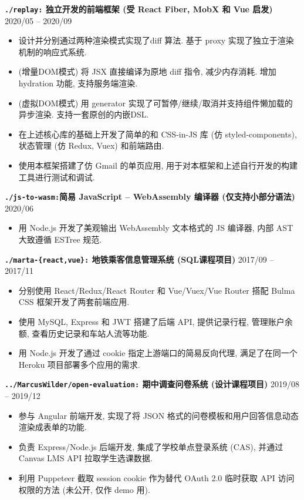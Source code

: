 \documentclass[10 pt]{article}
\begin{document}
\textbf{ \texttt{./replay:} 独立开发的前端框架 (受 React Fiber, MobX 和 Vue 启发) } \hfill 2020/05 -- 2020/09
\begin{itemize}
\item 设计并分别通过两种渲染模式实现了diff 算法. 基于 proxy 实现了独立于渲染机制的响应式系统.
\item (增量DOM模式) 将 JSX 直接编译为原地 diff 指令, 减少内存消耗. 增加 hydration 功能, 支持服务端渲染.
\item (虚拟DOM模式) 用 generator 实现了可暂停/继续/取消并支持组件懒加载的异步渲染. 支持一套原创的内嵌DSL.
\item 在上述核心库的基础上开发了简单的和 CSS-in-JS 库 (仿 styled-components), 状态管理 (仿 Redux, Vuex) 和前端路由.
\item 使用本框架搭建了仿 Gmail 的单页应用, 用于对本框架和上述自行开发的构建工具进行测试和调试.
\end{itemize}

\textbf{\texttt{./js-to-wasm:}简易 JavaScript -- WebAssembly 编译器 (仅支持小部分语法)} \hfill 2020/06
\begin{itemize}
\item 用 Node.js 开发了美观输出 WebAssembly 文本格式的 JS 编译器, 内部 AST 大致遵循 ESTree 规范.
\end{itemize}

\textbf{\texttt{./marta-\{react,vue\}:} 地铁乘客信息管理系统 (SQL课程项目) } \hfill 2017/09 -- 2017/11
\begin{itemize}
\item 分别使用 React/Redux/React Router 和 Vue/Vuex/Vue Router 搭配 Bulma  CSS 框架开发了两套前端应用.
\item 使用 MySQL, Express 和 JWT 搭建了后端 API, 提供记录行程, 管理账户余额, 查看历史记录和车站人流等功能.
\item 用 Node.js 开发了通过 cookie 指定上游端口的简易反向代理, 满足了在同一个 Heroku 项目部署多个应用的需求.
\end{itemize}

\textbf{\texttt{../MarcusWilder/open-evaluation:} 期中调查问卷系统 (设计课程项目)} \hfill 2019/08 -- 2019/12
\begin{itemize}
\item 参与 Angular 前端开发, 实现了将 JSON 格式的问卷模板和用户回答信息动态渲染成表单的功能.
\item 负责 Express/Node.js 后端开发, 集成了学校单点登录系统 (CAS), 并通过 Canvas LMS API 拉取学生选课数据.
\item 利用 Puppeteer 截取 session cookie 作为替代 OAuth 2.0 临时获取 API 访问权限的方法 (未公开, 仅作 demo 用).
\end{itemize}
\end{document}

